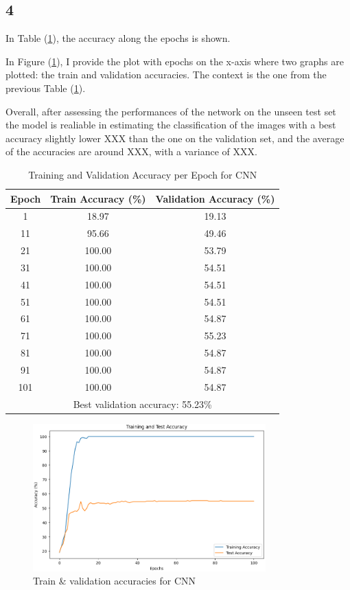\documentclass[11pt]{scrartcl}
\begin{document}
\subsection*{4}

In Table (\ref{tab:task2-accuracy}),
the accuracy along the epochs is shown.

In Figure (\ref{fig:task2-accuracy}), 
I provide the plot with epochs on the x-axis where two graphs are plotted:
the train and validation accuracies.
The context is the one from the previous Table (\ref{tab:task2-accuracy}). 

Overall, after assessing the performances of the network on the unseen test set
the model is realiable in estimating the classification of the images with
a best accuracy slightly lower XXX than the one on the validation set,
and the average of the accuracies are around XXX,
with a variance of XXX.

\begin{table}[htbp]
\centering
\caption{Training and Validation Accuracy per Epoch for CNN}
\begin{tabular}{ccc}
\toprule
\textbf{Epoch} & \textbf{Train Accuracy (\%)} & \textbf{Validation Accuracy (\%)} \\
\midrule
1    & 18.97  & 19.13  \\
11   & 95.66  & 49.46  \\
21   & 100.00 & 53.79  \\
31   & 100.00 & 54.51  \\
41   & 100.00 & 54.51  \\
51   & 100.00 & 54.51  \\
61   & 100.00 & 54.87  \\
71   & 100.00 & 55.23  \\
81   & 100.00 & 54.87  \\
91   & 100.00 & 54.87  \\
101  & 100.00 & 54.87  \\
\midrule
\multicolumn{3}{c}{Best validation accuracy: 55.23\%} \\
\bottomrule
\end{tabular}
\label{tab:task2-accuracy}
\end{table}

\begin{figure}[htbp]
\centering
\includegraphics[width=0.8\textwidth]{./figures/task2-accuracy.png}
\caption{Train \& validation accuracies for CNN}
\label{fig:task2-accuracy}
\end{figure}
\end{document}
